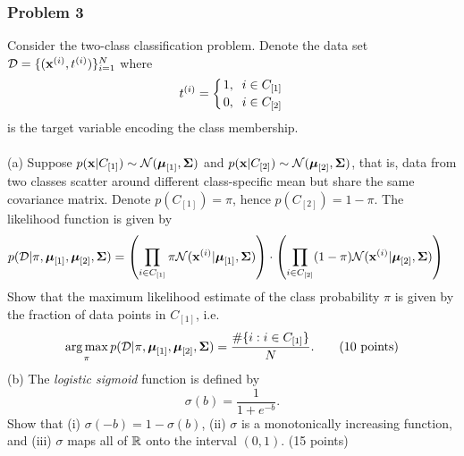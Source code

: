 \documentclass[12pt,a4paper]{article}
\renewcommand{\v}[1]{\ifmmode\mathbf{#1}\fi}
\renewcommand{\l}{\left}
\renewcommand{\r}{\right}
\DeclareMathOperator*{\argmax}{arg\,max}
\def\R{\ifmmode\mathbb R\fi}
\begin{document}
\newpage
\subsubsection*{Problem 3}
Consider the two-class classification problem. Denote the data set $\mathcal D = \{(\v x^{(i)}, t^{(i)}) \}_{i=1}^N$ where 
\begin{equation*}
t^{(i)} = \l\{{1, \;\; i \in C_{[1]} \atop 0, \;\; i \in C_{[2]}} \r.
\end{equation*}
is the target variable encoding the class membership. \\
\\
(a) Suppose $p(\v x \vert C_{[1]}) \sim \mathcal N(\boldsymbol\mu_{[1]}, \boldsymbol\Sigma)$ and $p(\v x \vert C_{[2]}) \sim \mathcal N(\boldsymbol\mu_{[2]}, \boldsymbol\Sigma)$, that is, data from two classes scatter around different class-specific mean but share the same covariance matrix. Denote $p(C_{[1]}) = \pi$, hence $p(C_{[2]}) = 1-\pi$. The likelihood function is given by 
\begin{equation*}
\begin{split}
p(\mathcal D \vert \pi, \boldsymbol\mu_{[1]}, \boldsymbol\mu_{[2]}, \boldsymbol\Sigma) 
& = \l(\prod_{i\in C_{[1]}} \pi \mathcal N(\v x^{(i)} \vert \boldsymbol\mu_{[1]}, \boldsymbol\Sigma)  \r) 
\cdot \l(\prod_{i\in C_{[2]}} (1-\pi)  \mathcal N(\v x^{(i)} \vert \boldsymbol\mu_{[2]}, \boldsymbol\Sigma)\r)
\end{split}
\end{equation*}
Show that the maximum likelihood estimate of the class probability $\pi$ is given by the fraction of data points in $C_{[1]}$, i.e.
\begin{equation*}
\argmax_{\pi} p(\mathcal D \vert \pi, \boldsymbol\mu_{[1]}, \boldsymbol\mu_{[2]}, \boldsymbol\Sigma) = \frac{ \#\{i : i \in C_{[1]} \} 
}N. \hskip20pt \text{(10 points)}
\end{equation*}
(b) The \textit{logistic sigmoid} function is defined by
\begin{equation*}
\sigma(b) = \frac1{1+e^{-b}}.
\end{equation*}
Show that (i) $\sigma(-b) = 1-\sigma(b)$, (ii) $\sigma$ is a monotonically increasing function, and (iii) $\sigma$ maps all of $\R$ onto the interval $(0, 1)$. (15 points) \\
\\
\end{document}
